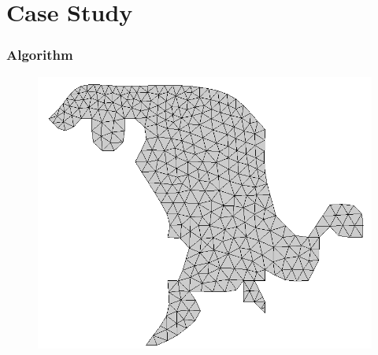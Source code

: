 \section{Case Study}

\begin{frame}
	\frametitle{Algorithm}
	\begin{figure}
		\centering
		\includegraphics[width=0.75\columnwidth]{images/foz_msh.png}
	\end{figure}
\end{frame}